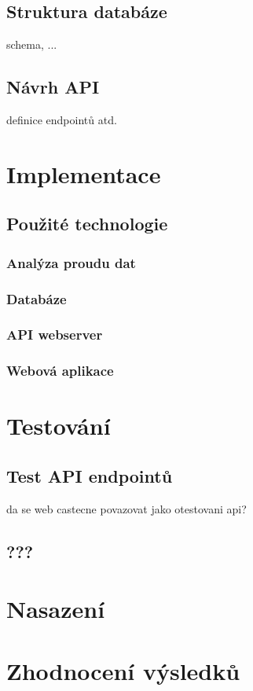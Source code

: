 \documentclass[thesis=B,czech]{FITthesis}[2012/06/26]
\begin{document}
\section{Struktura databáze}
	schema, ...
\section{Návrh API}
	definice endpointů atd.

\chapter{Implementace}
\section{Použité technologie}
\subsection{Analýza proudu dat}
\subsection{Databáze}
\subsection{API webserver}
\subsection{Webová aplikace}

\chapter{Testování}
\section{Test API endpointů}
	da se web castecne povazovat jako otestovani api?
\section{???}

\chapter{Nasazení}

\chapter{Zhodnocení výsledků}
\end{document}
